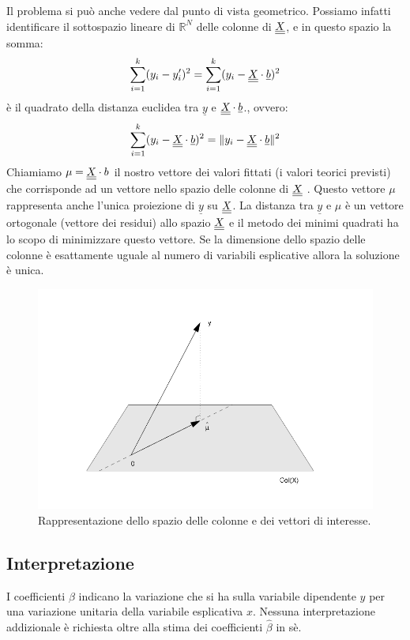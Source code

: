 Il problema si può anche vedere dal punto di vista geometrico. Possiamo infatti identificare il sottospazio lineare di $\mathbb{R}^N$ delle colonne di $\underline{\underline{X}}$, e in questo spazio la somma:
\begin{equation}
\sum_{i=1}^k (y_i - y'_i)^2 = \sum_{i=1}^k (y_i - \underline{\underline{X}} \cdot \underline{b})^2
\end{equation}
è il quadrato della distanza euclidea tra $\underline{y}$ e $\underline{\underline{X}} \cdot \underline{b}$., ovvero:
\begin{equation}
\sum_{i=1}^k (y_i - \underline{\underline{X}} \cdot \underline{b})^2 = \| y_i - \underline{\underline{X}} \cdot \underline{b} \|^2
\end{equation}
Chiamiamo $\mu = \underline{\underline{X}} \cdot b$ il nostro vettore dei valori fittati (i valori teorici previsti) che corrisponde ad un vettore nello spazio delle colonne di $\underline{\underline{X}}$ . Questo vettore $\mu$ rappresenta anche l'unica proiezione di $\underline{y}$ su $\underline{\underline{X}}$. La distanza tra $\underline{y}$ e $\mu$ è un vettore ortogonale (vettore dei residui) allo spazio $\underline{\underline{X}}$ e il metodo dei minimi quadrati ha lo scopo di minimizzare questo vettore. Se la dimensione dello spazio delle colonne è esattamente uguale al numero di variabili esplicative allora la soluzione è unica.
\begin{figure}
\includegraphics[scale=0.4]{Immagini/spazio-col.png}
\caption{Rappresentazione dello spazio delle colonne e dei vettori di interesse.}
\end{figure}

\subsection{Interpretazione}
I coefficienti $\beta$ indicano la variazione che si ha sulla variabile dipendente $y$ per una variazione unitaria della variabile esplicativa $x$. Nessuna interpretazione addizionale è richiesta oltre alla stima dei coefficienti $\hat{\beta}$ in sè.

